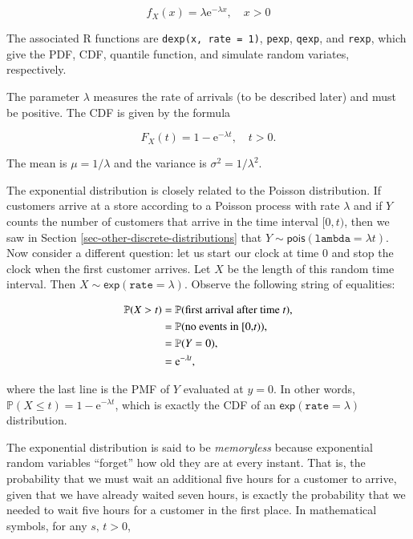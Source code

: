 \documentclass[]{book}
\numberwithin{equation}{chapter}
\numberwithin{figure}{chapter}
\theoremstyle{plain}
\theoremstyle{definition}
\theoremstyle{remark}
\theoremstyle{definition}
\theoremstyle{definition}
\theoremstyle{remark}
\begin{document}
\begin{equation}
f_{X}(x)=\lambda\mathrm{e}^{-\lambda x},\quad x>0
\end{equation}

The associated R functions are \texttt{dexp(x,\ rate\ =\ 1)},
\texttt{pexp}, \texttt{qexp}, and \texttt{rexp}, which give the PDF,
CDF, quantile function, and simulate random variates, respectively.

The parameter \(\lambda\) measures the rate of arrivals (to be described
later) and must be positive. The CDF is given by the formula

\begin{equation}
F_{X}(t)=1-\mathrm{e}^{-\lambda t},\quad t>0.
\end{equation}

The mean is \(\mu=1/\lambda\) and the variance is
\(\sigma^{2}=1/\lambda^{2}\).

The exponential distribution is closely related to the Poisson
distribution. If customers arrive at a store according to a Poisson
process with rate \(\lambda\) and if \(Y\) counts the number of
customers that arrive in the time interval \([0,t)\), then we saw in
Section \ref{sec-other-discrete-distributions} that
\(Y \sim \mathsf{pois}(\mathtt{lambda}=\lambda t).\) Now consider a
different question: let us start our clock at time 0 and stop the clock
when the first customer arrives. Let \(X\) be the length of this random
time interval. Then \(X\sim\mathsf{exp}(\mathtt{rate}=\lambda)\).
Observe the following string of equalities:

\begin{align*}
\mathbb{P}(X>t) & =\mathbb{P}(\mbox{first arrival after time \emph{t}}),\\
 & =\mathbb{P}(\mbox{no events in [0,\emph{t})}),\\
 & =\mathbb{P}(Y=0),\\
 & =\mathrm{e}^{-\lambda t},
\end{align*}

where the last line is the PMF of \(Y\) evaluated at \(y=0\). In other
words, \(\mathbb{P}(X\leq t)=1-\mathrm{e}^{-\lambda t}\), which is
exactly the CDF of an \(\mathsf{exp}(\mathtt{rate}=\lambda)\)
distribution.

The exponential distribution is said to be \emph{memoryless} because
exponential random variables ``forget'' how old they are at every
instant. That is, the probability that we must wait an additional five
hours for a customer to arrive, given that we have already waited seven
hours, is exactly the probability that we needed to wait five hours for
a customer in the first place. In mathematical symbols, for any
\(s,\, t>0\),
\end{document}
